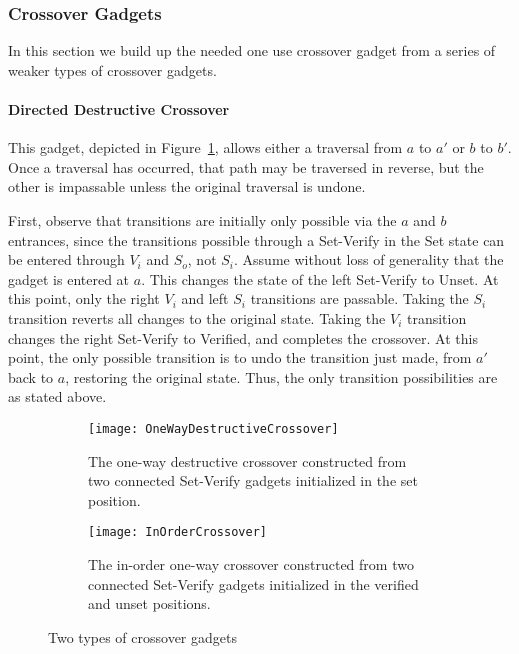 \subsubsection{Crossover Gadgets}
In this section we build up the needed one use crossover gadget from a series of weaker types of crossover gadgets.

\paragraph{Directed Destructive Crossover} This gadget, depicted in Figure~\ref{DestructiveCrossover}, allows either a traversal from $a$ to $a'$ or $b$ to $b'$. Once a traversal has occurred, that path may be traversed in reverse, but the other is impassable unless the original traversal is undone.

First, observe that transitions are initially only possible via the $a$ and $b$ entrances, since the transitions possible through a Set-Verify in the Set state can be entered through $V_i$ and $S_o$, not $S_i$. Assume without loss of generality that the gadget is entered at $a$. This changes the state of the left Set-Verify to Unset. At this point, only the right $V_i$ and left $S_i$ transitions are passable. Taking the $S_i$ transition reverts all changes to the original state. Taking the $V_i$ transition changes the right Set-Verify to Verified, and completes the crossover. At this point, the only possible transition is to undo the transition just made, from $a'$ back to $a$, restoring the original state. Thus, the only transition possibilities are as stated above.

\begin{figure}[!ht]
  \centering
  \begin{subfigure}[b]{0.47\textwidth}
    \texttt{[image: OneWayDestructiveCrossover]}
    \caption{The one-way destructive crossover constructed from two connected Set-Verify gadgets initialized in the set position.}
    \label{DestructiveCrossover}
  \end{subfigure}
  \hfill
  \begin{subfigure}[b]{0.47\textwidth}
    \texttt{[image: InOrderCrossover]}
    \caption{The in-order one-way crossover constructed from two connected Set-Verify gadgets initialized in the verified and unset positions.}
    \label{InOrderCrossover}
  \end{subfigure}
  \caption{Two types of crossover gadgets}
\end{figure}

